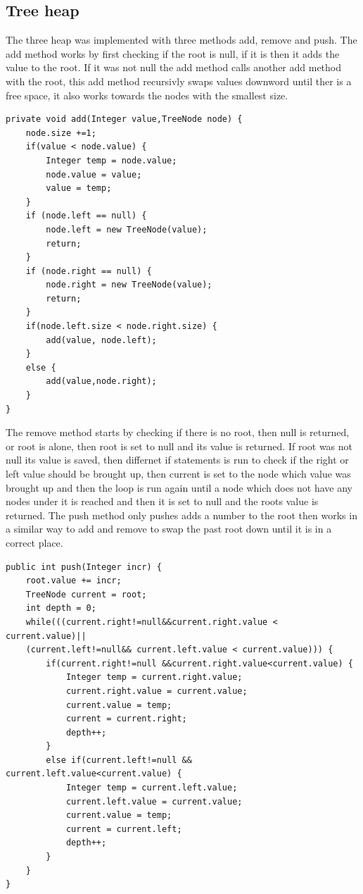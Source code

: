 \documentclass[a4paper,11pt]{article}
\begin{document}
\subsection*{Tree heap}
The three heap was implemented with three methods add, remove and push. 
The add method works by first checking if the root is null, if it is then it adds the value to the root. If it was not null 
the add method calls another add method with the root, this add method recursivly swaps values downword until ther is a free space, it also works towards the nodes with the smallest size.
\begin{verbatim}
private void add(Integer value,TreeNode node) {
    node.size +=1;
    if(value < node.value) {
        Integer temp = node.value;
        node.value = value;
        value = temp;
    }
    if (node.left == null) {
        node.left = new TreeNode(value);
        return;
    }
    if (node.right == null) {
        node.right = new TreeNode(value);
        return;
    }
    if(node.left.size < node.right.size) {
        add(value, node.left);
    }
    else {
        add(value,node.right);
    }
}
\end{verbatim}
The remove method starts by checking if there is no root, then null is returned, or root is alone, then root is set to null and its value is returned. If root was not null its value is saved, then
differnet if statements is run to check if the right or left value should be brought up, then current is set to the node which value was brought up and then the loop is run again until a node which does not have any nodes under it is reached and 
then it is set to null and the roots value is returned.
The push method only pushes adds a number to the root then works in a similar way to add and remove to swap the past root down until it is in a correct place. 
\begin{verbatim}
public int push(Integer incr) {
    root.value += incr;
    TreeNode current = root;
    int depth = 0;
    while(((current.right!=null&&current.right.value < current.value)||
    (current.left!=null&& current.left.value < current.value))) {
        if(current.right!=null &&current.right.value<current.value) {
            Integer temp = current.right.value;
            current.right.value = current.value;
            current.value = temp;
            current = current.right;
            depth++;
        }
        else if(current.left!=null && current.left.value<current.value) {
            Integer temp = current.left.value;
            current.left.value = current.value;
            current.value = temp;
            current = current.left;
            depth++;
        }
    }
}
\end{verbatim}
\end{document}
